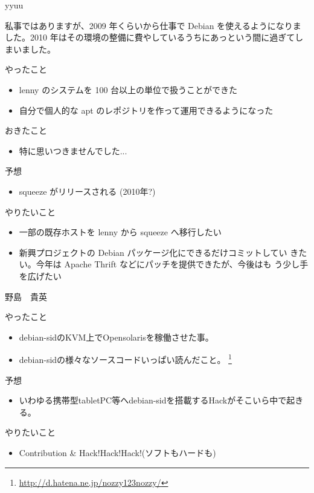 \begin{prework}{ yyuu }

私事ではありますが、2009 年くらいから仕事で Debian を使えるようになりま
 した。2010 年はその環境の整備に費やしているうちにあっという間に過ぎてし
 まいました。

やったこと
\begin{itemize}
 \item lenny のシステムを 100 台以上の単位で扱うことができた
 \item 自分で個人的な apt のレポジトリを作って運用できるようになった
\end{itemize}
おきたこと
\begin{itemize}
 \item 特に思いつきませんでした...
\end{itemize}

予想
 \begin{itemize}
  \item squeeze がリリースされる (2010年?)
 \end{itemize}
やりたいこと
\begin{itemize}
 \item 一部の既存ホストを lenny から squeeze へ移行したい
 \item 新興プロジェクトの Debian パッケージ化にできるだけコミットしてい
       きたい。今年は Apache Thrift などにパッチを提供できたが、今後はも
       う少し手を広げたい
\end{itemize}
\end{prework}

\begin{prework}{ 野島　貴英 }

やったこと
\begin{itemize}
 \item debian-sidのKVM上でOpensolarisを稼働させた事。
 \item debian-sidの様々なソースコードいっぱい読んだこと。
       \footnote{\url{http://d.hatena.ne.jp/nozzy123nozzy/}}
\end{itemize}
予想
\begin{itemize}
\item いわゆる携帯型tabletPC等へdebian-sidを搭載するHackがそこいら中で起きる。
\end{itemize}
やりたいこと
\begin{itemize}
 \item Contribution \& Hack!Hack!Hack!(ソフトもハードも)
\end{itemize}
\end{prework}

